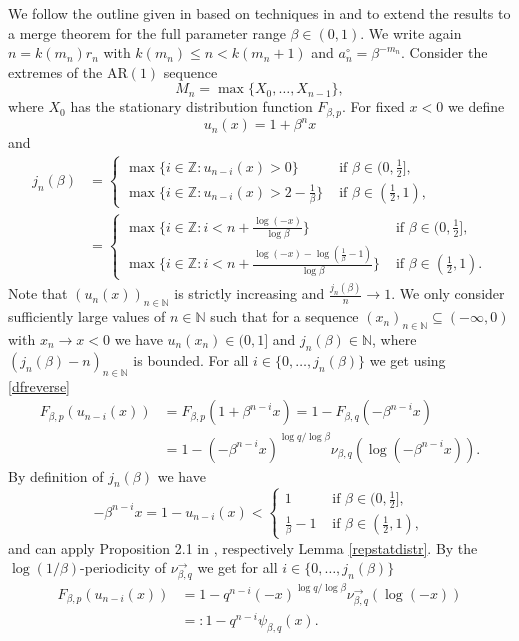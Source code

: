 \documentclass[12pt]{amsart}
\theoremstyle{definition}
\theoremstyle{remark}
\newcommand{\ganz}{{\mathbb Z}}
\newcommand{\nat}{{\mathbb N}}
\newcommand{\AR}{\operatorname{AR(1)}}
\numberwithin{equation}{section}
\begin{document}
We follow the outline given in \cite{Sterk} based on techniques in \cite{Cher} and \cite{GMS} to extend the results to a merge theorem for the full parameter range $\beta\in(0,1)$. We write again $n=k(m_{n})r_{n}$ with $k(m_{n})\leq n<k(m_{n}+1)$ and $a_{n}^{\circ}=\beta^{-m_{n}}$. Consider the extremes of the $\AR$ sequence
$$M_{n}=\max\{X_{0},\ldots,X_{n-1}\},$$
where $X_{0}$ has the stationary distribution function $F_{\beta,p}$. For fixed $x<0$ we define
$$u_{n}(x)=1+\beta^{n}x$$
and
\begin{align*}
j_{n}(\beta) & =\begin{cases}\max\{i\in\ganz:u_{n-i}(x)>0\} & \text{ if } \beta\in(0,\frac12],\\
\max\{i\in\ganz:u_{n-i}(x)>2-\frac1{\beta}\} & \text{ if }\beta\in(\frac12,1),\end{cases}\\
& =\begin{cases}\max\{i\in\ganz:i<n+\frac{\log(-x)}{\log\beta}\} & \text{ if } \beta\in(0,\frac12],\\
\max\{i\in\ganz:i<n+\frac{\log(-x)-\log(\frac1{\beta}-1)}{\log\beta}\} & \text{ if } \beta\in(\frac12,1).\end{cases}
\end{align*}
Note that $(u_{n}(x))_{n\in\nat}$ is strictly increasing and $\frac{j_{n}(\beta)}{n}\to1$. We only consider sufficiently large values of $n\in\nat$ such that for a sequence $(x_{n})_{n\in\nat}\subseteq(-\infty,0)$ with $x_{n}\to x<0$ we have $u_{n}(x_{n})\in(0,1]$ and $j_{n}(\beta)\in\nat$, where $(j_{n}(\beta)-n)_{n\in\nat}$ is bounded. For all $i\in\{0,\ldots,j_{n}(\beta)\}$ we get using \eqref{dfreverse}
\begin{align*}
F_{\beta,p}(u_{n-i}(x)) & =F_{\beta,p}(1+\beta^{n-i}x)=1-F_{\beta,q}(-\beta^{n-i}x)\\
& =1-(-\beta^{n-i}x)^{\log q/\log\beta}\nu_{\beta,q}(\log(-\beta^{n-i}x)).
\end{align*}
By definition of $j_{n}(\beta)$ we have
$$-\beta^{n-i}x=1-u_{n-i}(x)<\begin{cases}1 & \text{ if } \beta\in(0,\frac12],\\
\frac1{\beta}-1 & \text{ if } \beta\in(\frac12,1),\end{cases}$$
and can apply Proposition 2.1 in \cite{Sterk}, respectively Lemma \ref{repstatdistr}. By the $\log(1/\beta)$-periodicity of $\nu_{\beta,q}^{\to}$ we get for all $i\in\{0,\ldots,j_{n}(\beta)\}$
\begin{equation}\label{distrfirst}\begin{split}
F_{\beta,p}(u_{n-i}(x)) & =1-q^{n-i}(-x)^{\log q/\log\beta}\nu_{\beta,q}^{\to}(\log(-x))\\
& =:1-q^{n-i}\psi_{\beta,q}(x).
\end{split}\end{equation}
\end{document}
